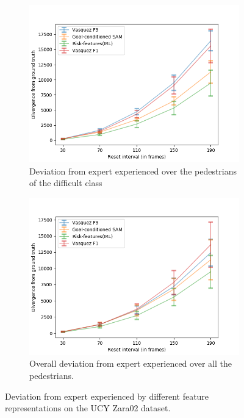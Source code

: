 \begin{figure}[htbp]
\begin{subfigure}{0.5\textwidth}
		\label{fig:inter_IRL-drift_analysis_med-zara02}
	\end{subfigure}
	\begin{subfigure}{0.5\textwidth}
		\centering
		\includegraphics[width=\linewidth]{plots/zara02_inter_irl_adjusted_speed/drift_hard_inter_irl_zara02_adjusted.png}
		\caption {Deviation from expert experienced over the pedestrians of the difficult class}
		\label{fig:inter_IRL-drift_analysis_hard-zara02}
	\end{subfigure}
	\begin{subfigure}{0.5\textwidth}
		\centering
		\includegraphics[width=\linewidth]{plots/zara02_inter_irl_adjusted_speed/drift_all_inter_irl_zara02_adjusted.png}
		\caption {Overall deviation from expert experienced over all the pedestrians.}
		\label{fig:inter_IRL-drift_analysis_all-zara02}
	\end{subfigure}
	\caption{Deviation from expert experienced by different feature representations on the UCY Zara02 dataset.}
	\label{fig:drift_analysis-inter_IRL-zara02}
\end{figure}


